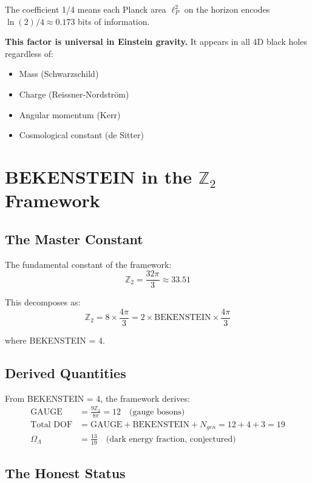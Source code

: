 \documentclass[12pt,a4paper]{article}
\begin{document}
The coefficient 1/4 means each Planck area $\ell_P^2$ on the horizon encodes $\ln(2)/4 \approx 0.173$ bits of information.

\textbf{This factor is universal in Einstein gravity.} It appears in all 4D black holes regardless of:
\begin{itemize}
    \item Mass (Schwarzschild)
    \item Charge (Reissner-Nordstr\"om)
    \item Angular momentum (Kerr)
    \item Cosmological constant (de Sitter)
\end{itemize}

\section{BEKENSTEIN in the $\mathbb{Z}_2$ Framework}

\subsection{The Master Constant}

The fundamental constant of the framework:
\begin{equation}
\mathbb{Z}_2 = \frac{32\pi}{3} \approx 33.51
\end{equation}

This decomposes as:
\begin{equation}
\mathbb{Z}_2 = 8 \times \frac{4\pi}{3} = 2 \times \text{BEKENSTEIN} \times \frac{4\pi}{3}
\end{equation}

where BEKENSTEIN = 4.

\subsection{Derived Quantities}

From BEKENSTEIN = 4, the framework derives:
\begin{align}
\text{GAUGE} &= \frac{9\mathbb{Z}_2}{8\pi} = 12 \quad \text{(gauge bosons)} \\
\text{Total DOF} &= \text{GAUGE} + \text{BEKENSTEIN} + N_{gen} = 12 + 4 + 3 = 19 \\
\Omega_\Lambda &= \frac{13}{19} \quad \text{(dark energy fraction, conjectured)}
\end{align}

\subsection{The Honest Status}
\end{document}
